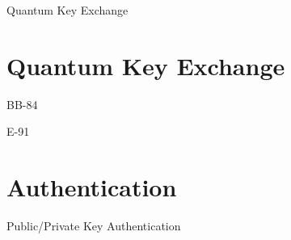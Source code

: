 \documentclass{beamer}
\begin{document}
	\begin{frame}{Quantum Key Exchange} %
		
	\end{frame}
	
	\section{Quantum Key Exchange}
	
	\begin{frame}{BB-84} %
		
	\end{frame}
	
	\begin{frame}{E-91} %
		
	\end{frame}
	
	\section{Authentication}
	
	\begin{frame}{Public/Private Key Authentication} %
		
	\end{frame}
	
	

	\begin{frame}[plain]\end{frame}
	
\end{document}
